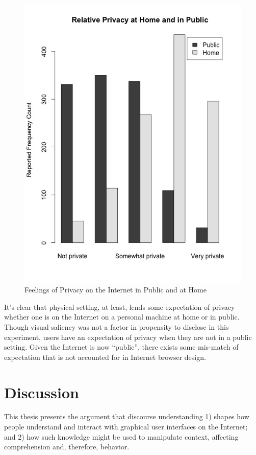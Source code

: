 \begin{figure}
\centerline{
\includegraphics[scale=.5]{chapter7.tex/exp3-graph}
}
\caption{Feelings of Privacy on the Internet in Public and at Home}
\label{privacy}
\end{figure}

It's clear that physical setting, at least, lends some expectation of privacy whether one is on the Internet on a personal machine at home or in public. Though visual saliency was not a factor in propensity to disclose in this experiment, users have an expectation of privacy when they are not in a public setting. Given the Internet is now ``public'', there exists some mis-match of expectation that is not accounted for in Internet browser design.

\chapter{Discussion}
\label{discussion}

This thesis presents the argument that discourse understanding 1) shapes how people understand and interact with graphical user interfaces on the Internet; and 2) how such knowledge might be used to manipulate context, affecting comprehension and, therefore, behavior.

